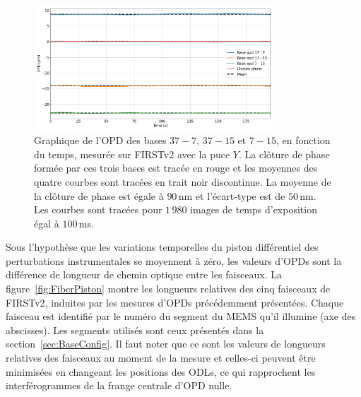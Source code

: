 \begin{figure}[ht!]
    \centering
    \includegraphics[width=0.8\textwidth]{Figure_Chap2/20221010_FullOnData_OPDFitCPvsTime_CP1_Pola1_Base_LaTex.png}
    \caption[Graphique de l'OPD de trois bases et de la clôture de phase en fonction du temps, mesurée sur FIRSTv2 avec la puce $Y$.]{Graphique de l'OPD des bases $37-7$, $37-15$ et $7-15$, en fonction du temps, mesurée sur FIRSTv2 avec la puce $Y$. La clôture de phase formée par ces trois bases est tracée en rouge et les moyennes des quatre courbes sont tracées en trait noir discontinue. La moyenne de la clôture de phase est égale à $90 \,$nm et l'écart-type est de $50 \,$nm. Les courbes sont tracées pour $1\,980$ images de temps d'exposition égal à $100 \,$ms.}
    \label{fig:OPDfitVStime}
\end{figure}

Sous l'hypothèse que les variations temporelles du piston différentiel des perturbations instrumentales se moyennent à zéro, les valeurs d'\ac{OPD}s sont la différence de longueur de chemin optique entre les faisceaux. La figure~\ref{fig:FiberPiston} montre les longueurs relatives des cinq faisceaux de \ac{FIRSTv2}, induites par les mesures d'\ac{OPD}s précédemment présentées. Chaque faisceau est identifié par le numéro du segment du \ac{MEMS} qu'il illumine (axe des abscisses). Les segments utilisés sont ceux présentés dans la section~\ref{sec:BaseConfig}. Il faut noter que ce sont les valeurs de longueurs relatives des faisceaux au moment de la mesure et celles-ci peuvent être minimisées en changeant les positions des \ac{ODL}s, ce qui rapprochent les interférogrammes de la frange centrale d'\ac{OPD} nulle.

